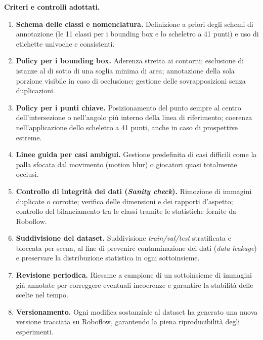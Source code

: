 \documentclass[12pt,a4paper,openright,twoside]{book}
\begin{document}
\smallskip
\noindent\textbf{Criteri e controlli adottati.}
\begin{enumerate}[label=(\alph*)]
  \item \textbf{Schema delle classi e nomenclatura.} Definizione a 
  priori degli schemi di annotazione (le 11 classi per i bounding 
  box e lo scheletro a 41 punti) e uso di etichette univoche e 
  consistenti.
  \item \textbf{Policy per i bounding box.} Aderenza stretta ai 
  contorni; esclusione di istanze al di sotto di una soglia minima 
  di area; annotazione della sola porzione visibile in caso di 
  occlusione; gestione delle sovrapposizioni senza duplicazioni.

  \item \textbf{Policy per i punti chiave.} Posizionamento del 
  punto sempre al centro dell'intersezione o nell'angolo più 
  interno della linea di riferimento; coerenza nell'applicazione 
  dello scheletro a 41 punti, anche in caso di prospettive estreme.

  \item \textbf{Linee guida per casi ambigui.} Gestione predefinita 
  di casi difficili come la palla sfocata dal movimento (motion 
  blur) o giocatori quasi totalmente occlusi.

  \item \textbf{Controllo di integrità dei dati (\emph{Sanity check}).} 
  Rimozione di immagini duplicate o corrotte; verifica delle dimensioni 
  e dei rapporti d'aspetto; controllo del bilanciamento tra le classi 
  tramite le statistiche fornite da Roboflow.

  \item \textbf{Suddivisione del dataset.} Suddivisione 
  \emph{train/val/test} stratificata e bloccata per scena, 
  al fine di prevenire contaminazione dei dati (\emph{data leakage}) 
  e preservare la distribuzione statistica in ogni sottoinsieme.

  \item \textbf{Revisione periodica.} Riesame a campione di un 
  sottoinsieme di immagini già annotate per correggere eventuali 
  incoerenze e garantire la stabilità delle scelte nel tempo.

  \item \textbf{Versionamento.} Ogni modifica sostanziale al 
  dataset ha generato una nuova versione tracciata su Roboflow, 
  garantendo la piena riproducibilità degli esperimenti.
\end{enumerate}
\end{document}

